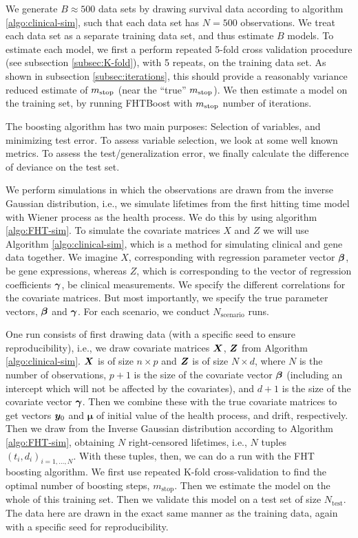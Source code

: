 We generate $B\approx500$ data sets by drawing survival data according to algorithm \ref{algo:clinical-sim}, such that each data set has $N=500$ observations. 
We treat each data set as a separate training data set, and thus estimate $B$ models.
To estimate each model, we first a perform repeated 5-fold cross validation procedure (see subsection \ref{subsec:K-fold}), with 5 repeats, on the training data set.
As shown in subsection \ref{subsec:iterations}, this should provide a reasonably variance reduced estimate of $m_{\text{stop}}$ (near the ``true'' $m_{\text{stop}}$).
We then estimate a model on the training set, by running FHTBoost with $m_{\text{stop}}$ number of iterations.

The boosting algorithm has two main purposes: Selection of variables, and minimizing test error.
To assess variable selection, we look at some well known metrics.
To assess the test/generalization error, we finally calculate the difference of deviance on the test set.

We perform simulations in which the observations are drawn from the inverse Gaussian distribution, i.e., we simulate lifetimes from the first hitting time model with Wiener process as the health process.
We do this by using algorithm \ref{algo:FHT-sim}.
To simulate the covariate matrices $X$ and $Z$ we will use Algorithm \ref{algo:clinical-sim}, which is a method for simulating clinical and gene data together.
We imagine $X$, corresponding with regression parameter vector $\boldsymbol{\beta}$, be gene expressions, whereas $Z$, which is corresponding to the vector of regression coefficients $\boldsymbol{\gamma}$, be clinical measurements.
We specify the different correlations for the covariate matrices.
But most importantly, we specify the true parameter vectors, $\boldsymbol{\beta}$ and $\boldsymbol{\gamma}$.
For each scenario, we conduct $N_{\text{scenario}}$ runs.

One run consists of first drawing data (with a specific seed to ensure reproducibility), i.e., we draw covariate matrices $\bm{X}$, $\bm{Z}$ from Algorithm \ref{algo:clinical-sim}.
$\bm{X}$ is of size $n\times p$ and $\bm{Z}$ is of size $N\times d$, where $N$ is the number of observations, $p+1$ is the size of the covariate vector $\boldsymbol{\beta}$ (including an intercept which will not be affected by the covariates), and $d+1$ is the size of the covariate vector $\boldsymbol{\gamma}$.
Then we combine these with the true covariate matrices to get vectors $\bm{y}_0$ and $\mathbf{\mu}$ of initial value of the health process, and drift, respectively.
Then we draw from the Inverse Gaussian distribution according to Algorithm \ref{algo:FHT-sim}, obtaining $N$ right-censored lifetimes, i.e., $N$ tuples $(t_i,d_i)_{i=1,\ldots,N}$.
With these tuples, then, we can do a run with the FHT boosting algorithm. We first use repeated K-fold cross-validation to find the optimal number of boosting steps, $m_{\text{stop}}$.
Then we estimate the model on the whole of this training set.
Then we validate this model on a test set of size $N_{\text{test}}$.
The data here are drawn in the exact same manner as the training data, again with a specific seed for reproducibility.

